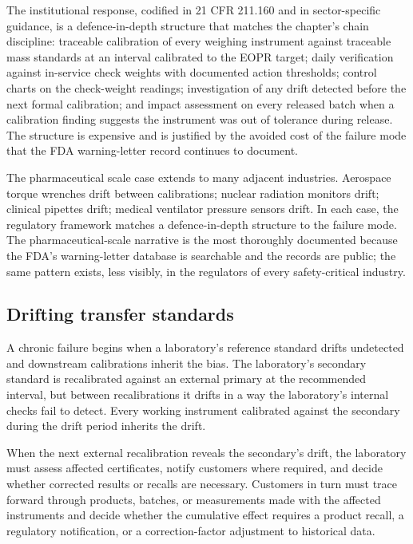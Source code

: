 The institutional response, codified in 21 CFR 211.160 and in
sector-specific guidance, is a defence-in-depth structure that
matches the chapter's chain discipline: traceable calibration of
every weighing instrument against traceable mass standards at an
interval calibrated to the EOPR target; daily verification against
in-service check weights with documented action thresholds; control
charts on the check-weight readings; investigation of any drift
detected before the next formal calibration; and impact assessment
on every released batch when a calibration finding suggests the
instrument was out of tolerance during release. The structure is
expensive and is justified by the avoided cost of the failure mode
that the FDA warning-letter record continues to document.

The pharmaceutical scale case extends to many adjacent industries.
Aerospace torque wrenches drift between calibrations; nuclear
radiation monitors drift; clinical pipettes drift; medical
ventilator pressure sensors drift. In each case, the regulatory
framework matches a defence-in-depth structure to the failure
mode. The pharmaceutical-scale narrative is the most thoroughly
documented because the FDA's warning-letter database is searchable
and the records are public; the same pattern exists, less
visibly, in the regulators of every safety-critical industry.

\subsection{Drifting transfer standards}

A chronic failure begins when a laboratory's reference standard
drifts undetected and downstream calibrations inherit the bias. The
laboratory's secondary standard is recalibrated against an external
primary at the recommended interval, but between recalibrations it
drifts in a way the laboratory's internal checks fail to detect.
Every working instrument calibrated against the secondary during the
drift period inherits the drift.

When the next external recalibration reveals the secondary's drift,
the laboratory must assess affected certificates, notify customers
where required, and decide whether corrected results or recalls are
necessary. Customers in turn must trace forward through products,
batches, or measurements made with the affected instruments and
decide whether the cumulative effect requires a product recall, a
regulatory notification, or a correction-factor adjustment to
historical data.

